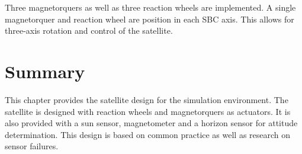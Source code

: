 Three magnetorquers as well as three reaction wheels are implemented. A single magnetorquer and reaction wheel are position in each SBC axis. This allows for three-axis rotation and control of the satellite.

\section{Summary}
This chapter provides the satellite design for the simulation environment. The satellite is designed with reaction wheels and magnetorquers as actuators. It is also provided with a sun sensor, magnetometer and a horizon sensor for attitude determination. This design is based on common practice as well as research on sensor failures.